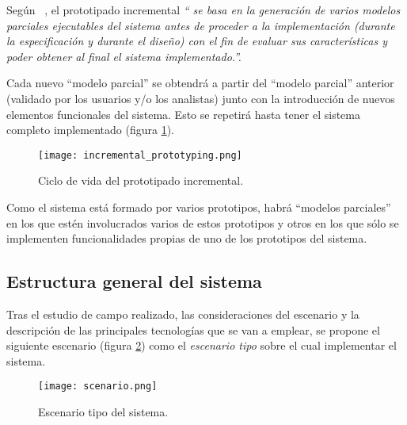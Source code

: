 Según ~\cite{bib:software_engineering}, el prototipado incremental \emph{``
se basa en la generación de varios modelos parciales ejecutables del sistema 
antes de proceder a la implementación (durante la especificación y durante el 
diseño) con el fin de evaluar sus características y poder obtener al final el 
sistema implementado.''.}

Cada nuevo ``modelo parcial'' se obtendrá a partir del ``modelo parcial''
anterior (validado por los usuarios y/o los analistas) junto con la
introducción de nuevos elementos funcionales del sistema. Esto se repetirá
hasta tener el sistema completo implementado (figura
\ref{fig:incremental_prototyping}).

\begin{figure}[!h]
  \begin{center}
    \texttt{[image: incremental\_prototyping.png]}
    \caption{Ciclo de vida del prototipado incremental.}
    \label{fig:incremental_prototyping}
  \end{center}
\end{figure}

Como el sistema está formado por varios prototipos, habrá ``modelos parciales''
en los que estén involucrados varios de estos prototipos y otros en los que
sólo se implementen funcionalidades propias de uno de los prototipos del
sistema.

  \subsection{Estructura general del sistema}
Tras el estudio de campo realizado, las consideraciones del escenario y la
descripción de las principales tecnologías que se van a emplear, se propone
el siguiente escenario (figura \ref{fig:scenario}) como el \emph{escenario
tipo} sobre el cual implementar el sistema.

\begin{figure}[!h]
  \begin{center}
    \texttt{[image: scenario.png]}
    \caption{Escenario tipo del sistema.}
    \label{fig:scenario}
  \end{center}
\end{figure}


